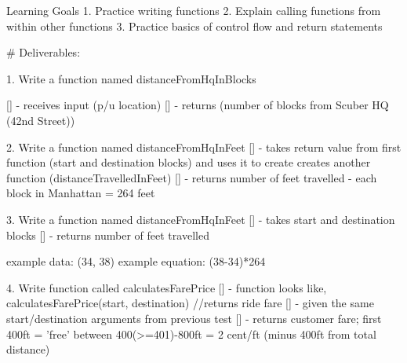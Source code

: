 Learning Goals
1. Practice writing functions
2. Explain calling functions from within other functions
3. Practice basics of control flow and return statements

# Deliverables:

1. Write a function named distanceFromHqInBlocks

    [] - receives input (p/u location)
    [] - returns (number of blocks from Scuber HQ (42nd Street))

2. Write a function named distanceFromHqInFeet
    [] - takes return value from first function (start and destination blocks)
       and uses it to create creates another function 
       (distanceTravelledInFeet)
    [] - returns number of feet travelled
        - each block in Manhattan = 264 feet
  
3. Write a function named distanceFromHqInFeet
    [] - takes start and destination blocks    
    [] - returns number of feet travelled
       
    example data: (34, 38) 
    example equation: (38-34)*264   

4. Write function called calculatesFarePrice
    [] - function looks like,
        calculatesFarePrice(start, destination) {
            //returns ride fare
       }
    [] - given the same start/destination arguments from previous test
    [] - returns customer fare;
        first 400ft = 'free'
        between 400(>=401)-800ft = 2 cent/ft (minus 400ft from total distance)

